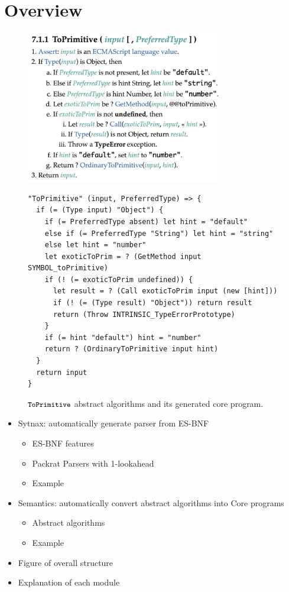 \section{Overview}

\begin{figure}
  \centering
  \includegraphics[height=18em]{img/to_primitive.png}
  \begin{lstlisting}[style=myCorestyle]
"ToPrimitive" (input, PreferredType) => {
  if (= (Type input) "Object") {
    if (= PreferredType absent) let hint = "default"
    else if (= PreferredType "String") let hint = "string"
    else let hint = "number"
    let exoticToPrim = ? (GetMethod input SYMBOL_toPrimitive)
    if (! (= exoticToPrim undefined)) {
      let result = ? (Call exoticToPrim input (new [hint]))
      if (! (= (Type result) "Object")) return result
      return (Throw INTRINSIC_TypeErrorPrototype)
    }
    if (= hint "default") hint = "number"
    return ? (OrdinaryToPrimitive input hint)
  }
  return input
}
  \end{lstlisting}
  \caption{\( \texttt{\small ToPrimitive} \) abstract algorithms
  and its generated core program.}
  \label{fig:to-primitive}
\end{figure}

\begin{itemize}
  \item Sytnax: automatically generate parser from ES-BNF
    \begin{itemize}
      \item ES-BNF features
      \item Packrat Parsers with 1-lookahead
      \item Example
    \end{itemize}
  \item Semantics: automatically convert abstract algorithms into Core programs
    \begin{itemize}
      \item Abstract algorithms
      \item Example
    \end{itemize}
\end{itemize}
\begin{itemize}
  \item Figure of overall structure
  \item Explanation of each module
\end{itemize}
